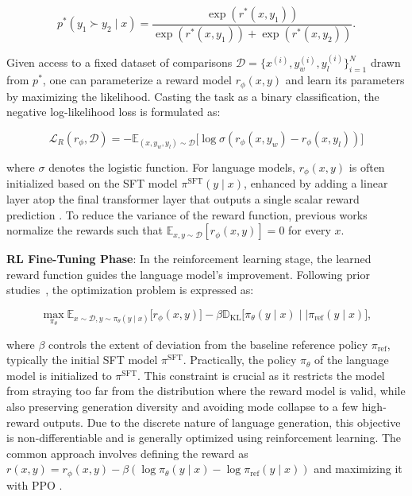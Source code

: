 \begin{equation}\label{eq:bradley-terry}
    p^*(y_1\succ y_2 \mid x)=\frac{\exp\left(r^*(x, y_1)\right)}{\exp\left(r^*(x, y_1)\right) + \exp\left(r^*(x, y_2)\right)}.
\end{equation}

Given access to a fixed dataset of comparisons $\mathcal{D}=\bigl\{x^{(i)}, y_w^{(i)}, y_l^{(i)}\bigr\}_{i=1}^N$ drawn from $p^*$, one can parameterize a reward model $r_{\phi}(x, y)$ and learn its parameters by maximizing the likelihood. Casting the task as a binary classification, the negative log-likelihood loss is formulated as:

\begin{equation}\label{eq:reward_model}
    \mathcal{L}_R(r_{\phi}, \mathcal{D}) = -\mathbb{E}_{(x, y_w, y_l)\sim \mathcal{D}}\bigl[\log \sigma(r_{\phi}(x, y_w)- r_{\phi}(x, y_l))\bigr]
\end{equation}

where $\sigma$ denotes the logistic function. For language models, $r_{\phi}(x, y)$ is often initialized based on the SFT model $\pi^\text{SFT}(y \mid x)$, enhanced by adding a linear layer atop the final transformer layer that outputs a single scalar reward prediction \cite{ziegler2020finetuning}. To reduce the variance of the reward function, previous works normalize the rewards such that $\mathbb{E}_{x,y\sim \mathcal{D}}\left[r_\phi(x, y)\right] = 0$ for every $x$.

\textbf{RL Fine-Tuning Phase}: In the reinforcement learning stage, the learned reward function guides the language model’s improvement. Following prior studies~\citep{jaques2017sequence, jaques2020human}, the optimization problem is expressed as:

\begin{equation}\label{eq:RL}
\max_{\pi_{\theta}}  \mathbb{E}_{x\sim \mathcal{D}, y\sim \pi_{\theta}(y \mid x)}\bigl[r_{\phi}(x, y)\bigr] - \beta\mathbb{D}_{\textrm{KL}}\bigl[\pi_{\theta}(y\mid x)\mid \mid \pi_\text{ref}(y\mid x)\bigr],
\end{equation}

where $\beta$ controls the extent of deviation from the baseline reference policy $\pi_\text{ref}$, typically the initial SFT model $\pi^\text{SFT}$. Practically, the policy $\pi_\theta$ of the language model is initialized to $\pi^\text{SFT}$. This constraint is crucial as it restricts the model from straying too far from the distribution where the reward model is valid, while also preserving generation diversity and avoiding mode collapse to a few high-reward outputs. Due to the discrete nature of language generation, this objective is non-differentiable and is generally optimized using reinforcement learning. The common approach \citep{ziegler2020finetuning, stiennon2022learning, bai2022training, ouyang2022training} involves defining the reward as ${r(x, y) = r_{\phi}(x, y) -\beta (\log \pi_{\theta}(y\mid x) - \log \pi_\text{ref}(y\mid x))}$ and maximizing it with PPO \cite{schulman2017proximal}.

